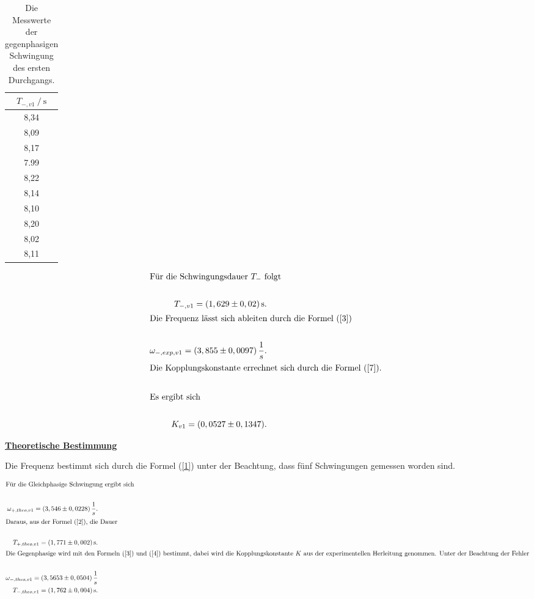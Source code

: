 \begin{table}[H] 
    \centering
    \caption{Die Messwerte der gegenphasigen Schwingung des ersten Durchgangs.}
    \label{Tabelle3}
    \begin{tabular} {c}
        \toprule
        {$ T_{-,v1 } \mathbin{/} \unit{\second} $} \\
        \midrule
         8,34 \\
         8,09 \\
         8,17 \\
         7.99 \\
         8,22 \\
         8,14 \\
         8,10 \\
         8,20 \\
         8,02 \\
         8,11 \\
        \bottomrule
    \end{tabular} 
\end{table}

\begin{align*}
    \intertext{Für die Schwingungsdauer $ T_{-} $ folgt} \\
    T_{-,v1} = (1,629 \pm 0,02)\, \unit{\second}.\\
    \intertext{Die Frequenz lässt sich ableiten durch die Formel (\ref{3})}\\
    \omega_{-,exp,v1} = (3,855 \pm 0,0097)\, \frac{1}{s}. \\
    \intertext{Die Kopplungskonstante errechnet sich durch die Formel (\ref{7}). } \\
    \intertext{Es ergibt sich}\\
    K_{v1} = (0,0527 \pm 0,1347).
\end{align*}

\underline{\textbf{Theoretische Bestimmung}}

\begin{flushleft}
    Die Frequenz bestimmt sich durch die Formel (\ref{1}) unter der Beachtung, dass fünf Schwingungen gemessen worden sind.
\end{flushleft}

\begin{align*}
    \intertext{Für die Gleichphasige Schwingung ergibt sich}\\
    \omega_{+,theo,v1} = (3,546 \pm 0,0228 )\, \frac{1}{s}.\\
    \intertext{Daraus, aus der Formel (\ref{2}), die Dauer }\\
    T_{+,theo,v1} = (1,771 \pm 0,002 )\, \unit{\second}.\\
    \intertext{Die Gegenphasige wird mit den Formeln (\ref{3}) und (\ref{4}) bestimmt, dabei wird die Kopplungskonstante $K$ aus der experimentellen Herleitung genommen. Unter der Beachtung der Fehler}\\  
    \omega_{-,theo,v1} = ( 3,5653 \pm 0,0504 )\, \frac{1}{s} \\
    T_{-,theo,v1} = (1,762 \pm 0,004 )\, \unit{\second}. \\
\end{align*}



